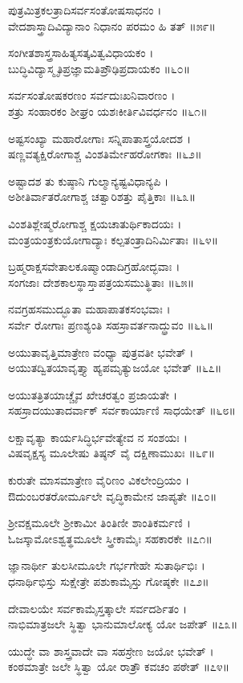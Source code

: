 ಪುತ್ರಮಿತ್ರಕಲತ್ರಾದಿಸರ್ವಸಂತೋಷಸಾಧನಂ ।\\
ವೇದಶಾಸ್ತ್ರಾದಿವಿದ್ಯಾನಾಂ ನಿಧಾನಂ ಪರಮಂ ಹಿ ತತ್ ॥೫೯॥

ಸಂಗೀತಶಾಸ್ತ್ರಸಾಹಿತ್ಯಸತ್ಕವಿತ್ವವಿಧಾಯಕಂ ।\\
ಬುದ್ಧಿವಿದ್ಯಾಸ್ಮೃತಿಪ್ರಜ್ಞಾಮತಿಪ್ರೌಢಿಪ್ರದಾಯಕಂ ॥೬೦॥

ಸರ್ವಸಂತೋಷಕರಣಂ ಸರ್ವದುಃಖನಿವಾರಣಂ ।\\
ಶತ್ರು ಸಂಹಾರಕಂ ಶೀಘ್ರಂ ಯಶಃಕೀರ್ತಿವಿವರ್ಧನಂ ॥೬೧॥

ಅಷ್ಟಸಂಖ್ಯಾ ಮಹಾರೋಗಾಃ ಸನ್ನಿಪಾತಾಸ್ತ್ರಯೋದಶ ।\\
ಷಣ್ಣವತ್ಯಕ್ಷಿರೋಗಾಶ್ಚ ವಿಂಶತಿರ್ಮೇಹರೋಗಕಾಃ ॥೬೨॥

ಅಷ್ಟಾದಶ ತು ಕುಷ್ಠಾನಿ ಗುಲ್ಮಾನ್ಯಷ್ಟವಿಧಾನ್ಯಪಿ ।\\
ಅಶೀತಿರ್ವಾತರೋಗಾಶ್ಚ ಚತ್ವಾರಿಶತ್ತು ಪೈತ್ತಿಕಾಃ ॥೬೩॥

ವಿಂಶತಿಶ್ಲೇಷ್ಮರೋಗಾಶ್ಚ ಕ್ಷಯಚಾತುರ್ಥಿಕಾದಯಃ ।\\
ಮಂತ್ರಯಂತ್ರಕುಯೋಗಾದ್ಯಾಃ ಕಲ್ಪತಂತ್ರಾದಿನಿರ್ಮಿತಾಃ ॥೬೪॥

ಬ್ರಹ್ಮರಾಕ್ಷಸವೇತಾಲಕೂಷ್ಮಾಂಡಾದಿಗ್ರಹೋದ್ಭವಾಃ ।\\
ಸಂಗಜಾಃ ದೇಶಕಾಲಸ್ಥಾಸ್ತಾಪತ್ರಯಸಮುತ್ಥಿತಾಃ ॥೬೫॥

ನವಗ್ರಹಸಮುದ್ಭೂತಾ ಮಹಾಪಾತಕಸಂಭವಾಃ ।\\
ಸರ್ವೇ ರೋಗಾಃ ಪ್ರಣಶ್ಯಂತಿ ಸಹಸ್ರಾವರ್ತನಾದ್ಧ್ರುವಂ ॥೬೬॥

ಅಯುತಾವೃತ್ತಿಮಾತ್ರೇಣ ವಂಧ್ಯಾ ಪುತ್ರವತೀ ಭವೇತ್ ।\\
ಅಯುತದ್ವಿತಯಾವೃತ್ತ್ಯಾ ಹ್ಯಪಮೃತ್ಯುಜಯೋ ಭವೇತ್ ॥೬೭॥

ಅಯುತತ್ರಿತಯಾಚ್ಚೈವ ಖೇಚರತ್ವಂ ಪ್ರಜಾಯತೇ ।\\
ಸಹಸ್ರಾದಯುತಾದರ್ವಾಕ್ ಸರ್ವಕಾರ್ಯಾಣಿ ಸಾಧಯೇತ್ ॥೬೮॥

ಲಕ್ಷಾವೃತ್ಯಾ ಕಾರ್ಯಸಿದ್ಧಿರ್ಭವೇತ್ಯೇವ ನ ಸಂಶಯಃ ।\\
ವಿಷವೃಕ್ಷಸ್ಯ ಮೂಲೇಷು ತಿಷ್ಠನ್ ವೈ ದಕ್ಷಿಣಾಮುಖಃ ॥೬೯॥

ಕುರುತೇ ಮಾಸಮಾತ್ರೇಣ ವೈರಿಣಂ ವಿಕಲೇಂದ್ರಿಯಂ ।\\
ಔದುಂಬರತರೋರ್ಮೂಲೇ ವೃದ್ಧಿಕಾಮೇನ ಜಾಪ್ಯತೇ ॥೭೦॥

ಶ್ರೀವಕ್ಷಮೂಲೇ ಶ್ರೀಕಾಮೀ ತಿಂತಿಣೀ ಶಾಂತಿಕರ್ಮಣಿ ।\\
ಓಜಸ್ಕಾಮೋಽಶ್ವತ್ಥಮೂಲೇ ಸ್ತ್ರೀಕಾಮೈಃ ಸಹಕಾರಕೇ ॥೭೧॥

ಜ್ಞಾನಾರ್ಥೀ ತುಲಸೀಮೂಲೇ ಗರ್ಭಗೇಹೇ ಸುತಾರ್ಥಿಭಿಃ ।\\
ಧನಾರ್ಥಿಭಿಸ್ತು ಸುಕ್ಷೇತ್ರೇ ಪಶುಕಾಮೈಸ್ತು ಗೋಷ್ಠಕೇ ॥೭೨॥

ದೇವಾಲಯೇ ಸರ್ವಕಾಮೈಸ್ತತ್ಕಾಲೇ ಸರ್ವದರ್ಶಿತಂ ।\\
ನಾಭಿಮಾತ್ರಜಲೇ ಸ್ಥಿತ್ವಾ ಭಾನುಮಾಲೋಕ್ಯ ಯೋ ಜಪೇತ್ ॥೭೩॥

ಯುದ್ಧೇ ವಾ ಶಾಸ್ತ್ರವಾದೇ ವಾ ಸಹಸ್ರೇಣ ಜಯೋ ಭವೇತ್ ।\\
ಕಂಠಮಾತ್ರೇ ಜಲೇ ಸ್ಥಿತ್ವಾ ಯೋ ರಾತ್ರೌ ಕವಚಂ ಪಠೇತ್ ॥೭೪॥

